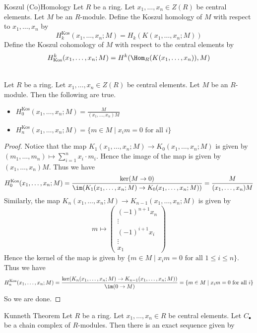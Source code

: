 \documentclass[a4paper]{article}
\begin{document}
\begin{defn}{Koszul (Co)Homology}{} Let $R$ be a ring. Let $x_1,\dots,x_n\in Z(R)$ be central elements. Let $M$ be an $R$-module. Define the Koszul homology of $M$ with respect to $x_1,\dots,x_n$ by $$H_k^\text{Kos}(x_1,\dots,x_n;M)=H_k(K(x_1,\dots,x_n;M))$$ Define the Koszul cohomology of $M$ with respect to the central elements by $$H_\text{Kos}^k(x_1,\dots,x_n;M)=H^k(\Hom_R(K(x_1,\dots,x_n)),M)$$
\end{defn}

\begin{lmm}{}{}\\
Let $R$ be a ring. Let $x_1,\dots,x_n\in Z(R)$ be central elements. Let $M$ be an $R$-module. Then the following are true. 
\begin{itemize}
\item $H_0^\text{Kos}(x_1,\dots,x_n;M)=\frac{M}{(x_1,\dots,x_n)M}$
\item $H_n^\text{Kos}(x_1,\dots,x_n;M)=\{m\in M\;|\;x_im=0\text{ for all }i\}$
\end{itemize}
\begin{proof}
Notice that the map $K_1(x_1,\dots,x_n;M)\to K_0(x_1,\dots,x_n;M)$ is given by $(m_1,\dots,m_n)\mapsto\sum_{i=1}^nx_i\cdot m_i$. Hence the image of the map is given by $(x_1,\dots,x_n)M$. Thus we have $$H_0^\text{Kos}(x_1,\dots,x_n;M)=\frac{\ker(M\to 0)}{\im(K_1(x_1,\dots,x_n;M)\to K_0(x_1,\dots,x_n;M))}=\frac{M}{(x_1,\dots,x_n)M}$$ Similarly, the map $K_n(x_1,\dots,x_n;M)\to K_{n-1}(x_1,\dots,x_n;M)$ is given by $$m\mapsto\begin{pmatrix}
(-1)^{n+1}x_n\\
\vdots\\
(-1)^{i+1}x_i\\
\vdots\\
x_1
\end{pmatrix}$$ Hence the kernel of the map is given by $\{m\in M\;|\;x_im=0\text{ for all }1\leq i\leq n\}$. Thus we have $$H_n^\text{Kos}(x_1,\dots,x_n;M)=\frac{\ker(K_n(x_1,\dots,x_n;M)\to K_{n-1}(x_1,\dots,x_n;M))}{\im(0\to M)}=\{m\in M\;|\;x_im=0\text{ for all }i\}$$ So we are done. 
\end{proof}
\end{lmm}

\begin{thm}{Kunneth Theorem}{} Let $R$ be a ring. Let $x_1,\dots,x_n\in R$ be central elements. Let $C_\bullet$ be a chain complex of $R$-modules. Then there is an exact sequence given by \\~\\
\end{thm}
\end{document}
